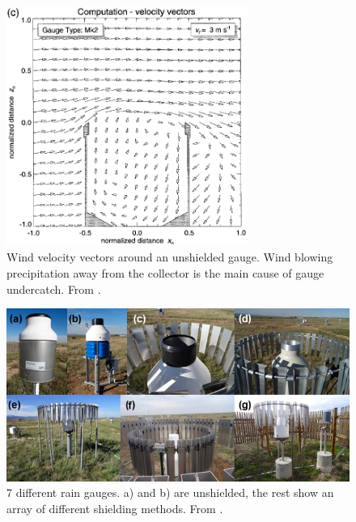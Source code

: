 \begin{figure}
    \centering
    \includegraphics[width=0.7\textwidth]{figures/undercatch}
    \decoRule
    \caption[Gauge undercatch theoretical example]{Wind velocity vectors around an unshielded gauge. Wind blowing precipitation away from the collector is the main cause of gauge undercatch. From \citet{Nespor1999}.}
    \label{fig:undercatch}
\end{figure}

\begin{figure}
    \centering
    \includegraphics[width=\textwidth]{figures/gauges}
    \decoRule
    \caption[Shielded and unshielded rain gauges]{7 different rain gauges. a) and b) are unshielded, the rest show an array of different shielding methods. From \citet{Kochendorfer2018}.}
    \label{fig:gauges}
\end{figure}

